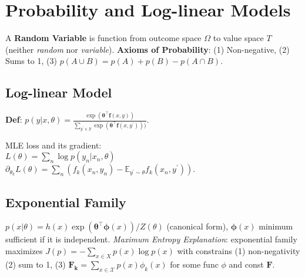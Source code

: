 \section{Probability and Log-linear Models}
A \textbf{Random Variable} is function from outcome space $\Omega$ to value space $T$ (neither \textit{random} nor \textit{variable}). 
\textbf{Axioms of Probability}: (1) Non-negative, (2) Sums to 1, (3) $p(A \cup B)=p(A) + p(B) - p(A\cap B)$.
\subsection*{Log-linear Model}
\textbf{Def}: $p(y| x, \theta)  = \frac{\exp(\mathbf{\theta}^{\top}\mathbf{f}(x,y))}{\sum_{y^\prime \in \mathcal{Y}}\exp(\mathbf{\theta}^{\top}\mathbf{f}(x,y^\prime)))}$.

MLE loss and its gradient: \\
$L(\theta)=\sum_{n} \log p(y_n| x_n, \theta)$ \\
$\partial_{\theta_k}L(\theta) = \sum_{n} \left( f_k(x_n, y_n) - \mathbb{E}_{y^{\prime}
\sim \theta}f_k(x_n, y^\prime) \right) $.

\subsection*{Exponential Family}
$p(x|\theta) = h(x)\exp(\mathbf{\theta}^{\top} \mathbf{\phi}(x)) / {Z(\theta)}$ (canonical form), $\mathbf{\phi}(x)$ minimum sufficient if it is independent. \emph{Maximum Entropy Explanation}: exponential family maximizes $J(p)=-\sum_{x \in X} p(x) \log p(x)$ with constrains (1) non-negativity (2) sum to 1, (3) $\mathbf{F_k}=\sum_{x \in \mathcal{X}} p(x) \phi_{k}(x)$ for some func $\phi$ and const $\mathbf{F}$.
